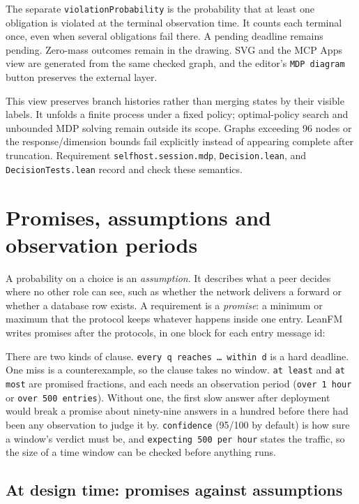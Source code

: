 The separate \texttt{violationProbability} is the probability that at least
one obligation is violated at the terminal observation time. It counts each
terminal once, even when several obligations fail there. A pending deadline
remains pending. Zero-mass outcomes remain in the drawing. SVG and the MCP
Apps view are generated from the same checked graph, and the editor's
\texttt{MDP diagram} button preserves the external layer.

This view preserves branch histories rather than merging states by their
visible labels. It unfolds a finite process under a fixed policy; optimal-policy
search and unbounded MDP solving remain outside its scope. Graphs exceeding
96 nodes or the response/dimension bounds fail explicitly instead of appearing
complete after truncation. Requirement \texttt{selfhost.session.mdp},
\texttt{Decision.lean}, and \texttt{DecisionTests.lean} record and check these
semantics.

\section{Promises, assumptions and observation periods}
\label{sec:sla}

A probability on a choice is an \emph{assumption}. It describes what a peer
decides where no other role can see, such as whether the network delivers a
forward or whether a database row exists. A requirement is a \emph{promise}: a
minimum or maximum that the protocol keeps whatever happens inside one entry.
LeanFM writes promises after the protocols, in one block for each entry
message id:



There are two kinds of clause. \texttt{every q reaches \dots\ within d} is a
hard deadline. One miss is a counterexample, so the clause takes no window.
\texttt{at least} and \texttt{at most} are promised fractions, and each needs
an observation period (\texttt{over 1 hour} or \texttt{over 500 entries}).
Without one, the first slow answer after deployment would break a promise about
ninety-nine answers in a hundred before there had been any observation to judge
it by. \texttt{confidence} (95/100 by default) is how sure a window's verdict
must be, and \texttt{expecting 500 per hour} states the traffic, so the size of
a time window can be checked before anything runs.

\subsection{At design time: promises against assumptions}

